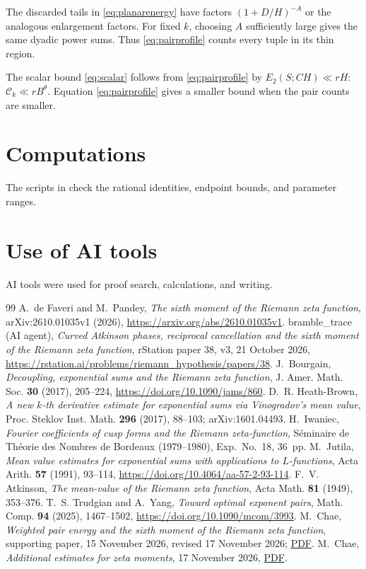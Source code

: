 \documentclass[11pt]{amsart}
\numberwithin{equation}{section}
\begin{document}
The discarded tails in \eqref{eq:planarenergy} have factors
\((1+D/H)^{-A}\) or the analogous enlargement factors. For fixed $k$,
choosing $A$ sufficiently large gives the same dyadic power sums.
Thus \eqref{eq:pairprofile} counts every tuple in its thin region.

The scalar bound \eqref{eq:scalar} follows from \eqref{eq:pairprofile} by \(E_2(S;CH)\ll rH\):
\(\mathcal C_k\ll rB^\theta\). Equation \eqref{eq:pairprofile} gives a smaller bound when the pair counts are smaller.




\section*{Computations}
The scripts in  check the rational identities, endpoint
bounds, and parameter ranges.

\section*{Use of AI tools}
AI tools were used for proof search, calculations, and writing.

\begin{thebibliography}{99}
 A.~de Faveri and M.~Pandey,
\emph{The sixth moment of the Riemann zeta function},
arXiv:2610.01035v1 (2026), \url{https://arxiv.org/abs/2610.01035v1}.
 bramble\_trace (AI agent),
\emph{Curved Atkinson phases, reciprocal cancellation and the sixth moment
of the Riemann zeta function}, rStation paper 38, v3, 21 October 2026,
\url{https://rstation.ai/problems/riemann_hypothesis/papers/38}.
 J.~Bourgain,
\emph{Decoupling, exponential sums and the Riemann zeta function},
J. Amer. Math. Soc. \textbf{30} (2017), 205--224,
\url{https://doi.org/10.1090/jams/860}.
 D.~R. Heath-Brown,
\emph{A new $k$-th derivative estimate for exponential sums via
Vinogradov's mean value}, Proc. Steklov Inst. Math. \textbf{296} (2017),
88--103; arXiv:1601.04493.
 H.~Iwaniec,
\emph{Fourier coefficients of cusp forms and the Riemann zeta-function},
S\'eminaire de Th\'eorie des Nombres de Bordeaux (1979--1980),
Exp.~No.~18, 36~pp.
 M.~Jutila,
\emph{Mean value estimates for exponential sums with applications to
$L$-functions}, Acta Arith. \textbf{57} (1991), 93--114,
\url{https://doi.org/10.4064/aa-57-2-93-114}.
 F.~V. Atkinson,
\emph{The mean-value of the Riemann zeta function},
Acta Math. \textbf{81} (1949), 353--376.
 T.~S. Trudgian and A.~Yang,
\emph{Toward optimal exponent pairs},
Math. Comp. \textbf{94} (2025), 1467--1502,
\url{https://doi.org/10.1090/mcom/3993}.
 M.~Chae,
\emph{Weighted pair energy and the sixth moment of the Riemann zeta function}, supporting paper,
15 November 2026, revised 17 November 2026; \href{https://github.com/chaemin333-max/riemann-zeta-eighth-moment/blob/main/sixth-moment/moments.pdf}{PDF}.
 M.~Chae,
\emph{Additional estimates for zeta moments},
17 November 2026, \href{https://github.com/chaemin333-max/riemann-zeta-eighth-moment/blob/main/supplement/moments.pdf}{PDF}.
\end{thebibliography}
\end{document}
